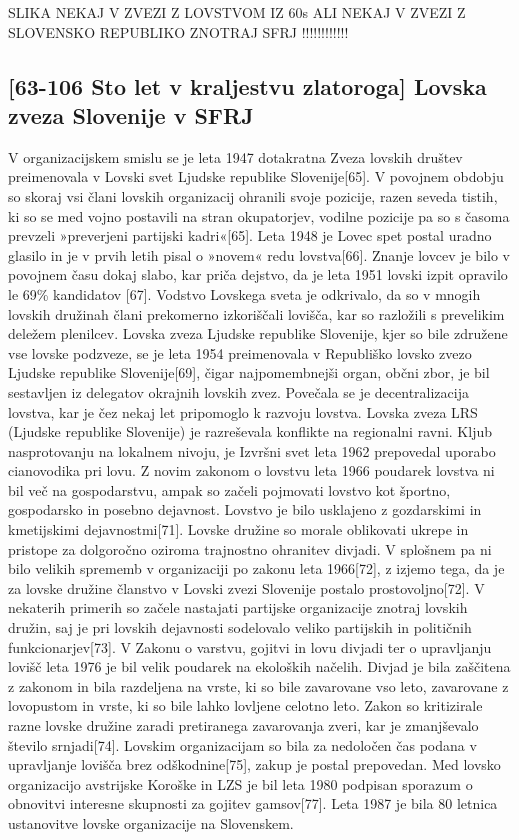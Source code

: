 \documentclass[a4paper,12pt,openright]{book}
\begin{document}
SLIKA NEKAJ V ZVEZI Z LOVSTVOM IZ 60s ALI NEKAJ V ZVEZI Z SLOVENSKO REPUBLIKO ZNOTRAJ SFRJ !!!!!!!!!!!!

\subsection{[63-106 Sto let v kraljestvu zlatoroga] Lovska zveza Slovenije v SFRJ }

V organizacijskem smislu se je leta 1947 dotakratna Zveza lovskih društev preimenovala v Lovski svet Ljudske republike Slovenije[65]. 
V povojnem obdobju so skoraj vsi člani lovskih organizacij ohranili svoje pozicije, razen seveda tistih, ki so se med vojno postavili na stran okupatorjev, vodilne pozicije pa so s časoma prevzeli »preverjeni partijski kadri«[65]. 
Leta 1948 je Lovec spet postal uradno glasilo in je v prvih letih pisal o »novem« redu lovstva[66].
Znanje lovcev je bilo v povojnem času dokaj slabo, kar priča dejstvo, da je leta 1951 lovski izpit opravilo le 69\% kandidatov [67].
Vodstvo Lovskega sveta je odkrivalo, da so v mnogih lovskih družinah člani prekomerno izkoriščali lovišča, kar so razložili s prevelikim deležem plenilcev.
Lovska zveza Ljudske republike Slovenije, kjer so bile združene vse lovske podzveze, se je leta 1954 preimenovala v Republiško lovsko zvezo Ljudske republike Slovenije[69], čigar najpomembnejši organ, občni zbor, je bil sestavljen iz delegatov okrajnih lovskih zvez.
Povečala se je decentralizacija lovstva, kar je čez nekaj let pripomoglo k razvoju lovstva.
Lovska zveza LRS (Ljudske republike Slovenije) je razreševala konflikte na regionalni ravni. 
Kljub nasprotovanju na lokalnem nivoju, je Izvršni svet leta 1962 prepovedal uporabo cianovodika pri lovu. 
Z novim zakonom o lovstvu leta 1966 poudarek lovstva ni bil več na gospodarstvu, ampak so začeli pojmovati lovstvo kot športno, gospodarsko in posebno dejavnost.
Lovstvo je bilo usklajeno z gozdarskimi in kmetijskimi dejavnostmi[71]. 
Lovske družine so morale oblikovati ukrepe in pristope za dolgoročno oziroma trajnostno ohranitev divjadi. 
V splošnem pa ni bilo velikih sprememb v organizaciji po zakonu leta 1966[72], z izjemo tega, da je za lovske družine članstvo v Lovski zvezi Slovenije postalo prostovoljno[72]. V nekaterih primerih so začele nastajati partijske organizacije znotraj lovskih družin, saj je pri lovskih dejavnosti sodelovalo veliko partijskih in političnih funkcionarjev[73].
V Zakonu o varstvu, gojitvi in lovu divjadi ter o upravljanju lovišč leta 1976 je bil velik poudarek na ekoloških načelih. 
Divjad je bila zaščitena z zakonom in bila razdeljena na vrste, ki so bile zavarovane vso leto, zavarovane z lovopustom in vrste, ki so bile lahko lovljene celotno leto. 
Zakon so kritizirale razne lovske družine zaradi pretiranega zavarovanja zveri, kar je zmanjševalo število srnjadi[74].
Lovskim organizacijam so bila za nedoločen čas podana v upravljanje lovišča brez odškodnine[75], zakup je postal prepovedan. 
Med lovsko organizacijo avstrijske Koroške in LZS je bil leta 1980 podpisan sporazum o obnovitvi interesne skupnosti za gojitev gamsov[77].
Leta 1987 je bila 80 letnica ustanovitve lovske organizacije na Slovenskem. \cite{Sto_63_77}
\end{document}
